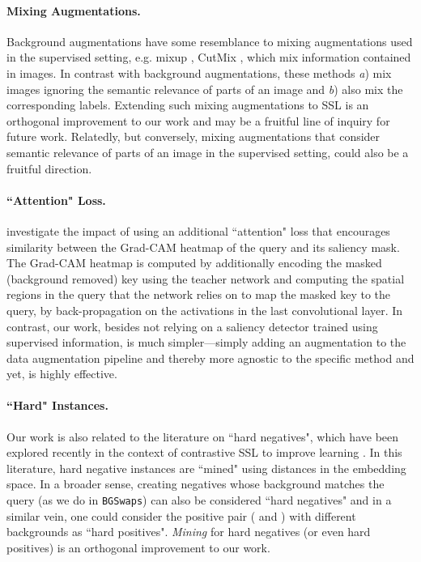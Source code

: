 \documentclass[twoside,11pt]{article}
\newcommand{\bgswaps}{\texttt{BG\textunderscore Swaps}}
\begin{document}
\paragraph{Mixing Augmentations.}
Background augmentations have some resemblance to mixing augmentations used in the supervised setting, e.g. mixup \citep{mixup}, CutMix \citep{yun_cutmix_2019}, which mix information contained in images. In contrast with background augmentations, these methods \textit{a}) mix images ignoring the semantic relevance of parts of an image and \textit{b}) also mix the corresponding labels. Extending such mixing augmentations to SSL is an orthogonal improvement to our work and may be a fruitful line of inquiry for future work. Relatedly, but conversely, mixing augmentations that consider semantic relevance of parts of an image in the supervised setting, could also be a fruitful direction.

\paragraph{``Attention" Loss.} \citet{selvaraju2020casting} investigate the impact of using an additional ``attention" loss that encourages similarity between the Grad-CAM heatmap of the query and its saliency mask. The Grad-CAM heatmap is computed by additionally encoding the masked (background removed) key using the teacher network and computing the spatial regions in the query that the network relies on to map the masked key to the query, by back-propagation on the activations in the last convolutional layer. In contrast, our work, besides not relying on a saliency detector trained using supervised information, is much simpler---simply adding an augmentation to the data augmentation pipeline and thereby more agnostic to the specific method and yet, is highly effective.

\paragraph{``Hard" Instances.} 
Our work is also related to the literature on ``hard negatives", which have been explored recently in the context of contrastive SSL to improve learning \citep{kalantidis2020hard, wu2021conditional, robinson2021contrastive, cai_2020}. In this literature, hard negative instances are ``mined" using distances in the embedding space. In a broader sense, creating negatives whose background matches the query (as we do in \bgswaps) can also be considered ``hard negatives" and in a similar vein, one could consider the positive pair ( and ) with different backgrounds as ``hard positives". \textit{Mining} for hard negatives (or even hard positives) is an orthogonal improvement to our work. 
\end{document}

